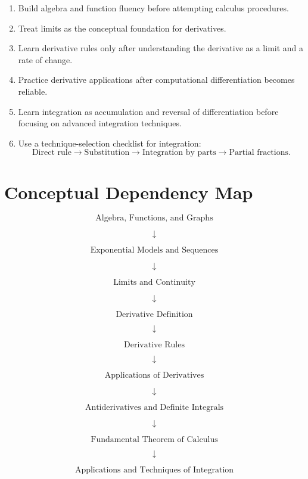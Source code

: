 \documentclass[11pt]{article}
\begin{document}
\begin{enumerate}
    \item Build algebra and function fluency before attempting calculus procedures.
    \item Treat limits as the conceptual foundation for derivatives.
    \item Learn derivative rules only after understanding the derivative as a limit and a rate of change.
    \item Practice derivative applications after computational differentiation becomes reliable.
    \item Learn integration as accumulation and reversal of differentiation before focusing on advanced integration techniques.
    \item Use a technique-selection checklist for integration:
    \[
    \text{Direct rule} \rightarrow
    \text{Substitution} \rightarrow
    \text{Integration by parts} \rightarrow
    \text{Partial fractions}.
    \]
\end{enumerate}

\section{Conceptual Dependency Map}

\[
\boxed{\text{Algebra, Functions, and Graphs}}
\]

\[
\downarrow
\]

\[
\boxed{\text{Exponential Models and Sequences}}
\]

\[
\downarrow
\]

\[
\boxed{\text{Limits and Continuity}}
\]

\[
\downarrow
\]

\[
\boxed{\text{Derivative Definition}}
\]

\[
\downarrow
\]

\[
\boxed{\text{Derivative Rules}}
\]

\[
\downarrow
\]

\[
\boxed{\text{Applications of Derivatives}}
\]

\[
\downarrow
\]

\[
\boxed{\text{Antiderivatives and Definite Integrals}}
\]

\[
\downarrow
\]

\[
\boxed{\text{Fundamental Theorem of Calculus}}
\]

\[
\downarrow
\]

\[
\boxed{\text{Applications and Techniques of Integration}}
\]
\end{document}

